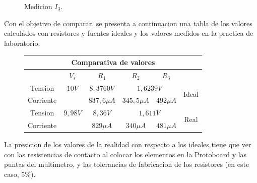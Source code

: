 \documentclass[a4paper,12pt, spanish]{report}
\begin{document}
\begin{figure}[H]
\begin{minipage}{0.3\textwidth}
            \caption{Medicion $I_3$.}
          \end{minipage}
      \end{figure}


      Con el objetivo de comparar, se presenta a continuacion una tabla de los valores calculados con resistores y
      fuentes ideales y los valores medidos en la practica de laboratorio:
      \begin{figure}[!h]
        \centering
        \begin{tabular}[c]{|c||c|c|c|c||c|}
          \hline
          \multicolumn{6}{|c|}{Comparativa de valores}\\
          \hline
                    & $V_s$         & $R_1$         & $R_2$         & $R_3$         & \\
          \hline
          Tension   & $10V$         & $8,3760V$     & \multicolumn{2}{|c||}{$1,6239V$} & \multirow{2}{*}{Ideal}\\
          \cline{1-5}
          Corriente &               & $837,6\mu A$  & $345,5\mu A$  & $492\mu A$    & \\
          \hline
          Tension   & $9,98V$       & $8,36V$       & \multicolumn{2}{|c||}{$1,611V$}  & \multirow{2}{*}{Real}\\
          \cline{1-5}
          Corriente &               & $829\mu A$    & $340\mu A$    & $481\mu A$    & \\
          \hline
        \end{tabular}
      \end{figure}
      
      La presicion de los valores de la realidad con respecto a los ideales tiene que ver con las resistencias de
      contacto al colocar los elementos en la Protoboard y las puntas del multimetro, y las tolerancias de fabricacion
      de los resistores (en este caso, 5\%).
\end{document}
